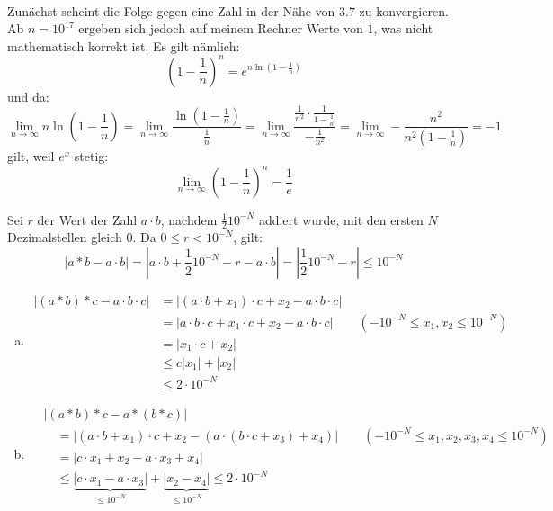 \documentclass{scrartcl}
\begin{document}
\setcounter{aufgabe}{0}

\begin{aufgabe}~

	Zunächst scheint die Folge gegen eine Zahl in der Nähe von $3.7$ zu konvergieren.
	Ab $n=10^{17}$ ergeben sich jedoch auf meinem Rechner Werte von $1$, was nicht mathematisch korrekt ist.
Es gilt nämlich:
\[
\left(1-\frac 1n\right)^n=e^{n\ln\left(1-\frac 1n\right)}
\]
und da:
\[
\lim_{n\to\infty}n\ln\left(1-\frac 1n\right)
=\lim_{n\to\infty}\frac{\ln\left(1-\frac 1n\right)}{\frac 1n}
=\lim_{n\to\infty}\frac{\frac 1{n^2}\cdot\frac 1{1-\frac 1n}}{-\frac 1{n^2}}
=\lim_{n\to\infty}-\frac{n^2}{n^2\left(1-\frac 1n\right)}
=-1
\]
gilt, weil $e^x$ stetig:
\[
\lim_{n\to\infty}\left(1-\frac 1n\right)^n=\frac 1e
\]

\end{aufgabe}

\begin{aufgabe}
\begin{lem*}
Sei $r$ der Wert der Zahl $a\cdot b$, nachdem $\frac 12 10^{-N}$ addiert wurde, mit den ersten $N$ Dezimalstellen gleich $0$.
Da $0\le r<10^{-N}$, gilt:
\[
\left|a\ast b-a\cdot b\right|
=\left|a\cdot b + \frac 12 10^{-N} - r -a\cdot b\right|
=\left|\frac 12 10^{-N}-r\right|
\le 10^{-N}
\]
\end{lem*}
\begin{enumerate}[a)]
\item
\begin{align*}
\left| (a\ast b)\ast c - a\cdot b\cdot c\right|
&= \left| (a\cdot b+x_1)\cdot c + x_2 - a\cdot b\cdot c\right|\\
&=\left| a\cdot b\cdot c +x_1\cdot c+x_2-a \cdot b\cdot c\right| \qquad (-10^{-N}\le x_1,x_2\le 10^{-N})\\
&=\left| x_1\cdot c+x_2\right|\\
&\le c|x_1|+|x_2|\\
&\le 2\cdot 10^{-N}
\end{align*}
\item
\begin{align*}
&\left|(a\ast b)\ast c - a\ast(b\ast c)\right|\\
&\quad =\left|(a\cdot b+x_1)\cdot c+x_2-(a\cdot(b\cdot c + x_3)+x_4)\right| \qquad (-10^{-N}\le x_1,x_2,x_3,x_4\le 10^{-N})\\
&\quad =\left|c\cdot x_1+x_2-a\cdot x_3+x_4\right|\\
&\quad \le\underbrace{\left|c\cdot x_1-a\cdot x_3\right|}_{\le 10^{-N}} + \underbrace{\left|x_2-x_4\right|}_{\le 10^{-N}}
\le 2\cdot 10^{-N}
\end{align*}
\end{enumerate}
\end{aufgabe}
\end{document}
